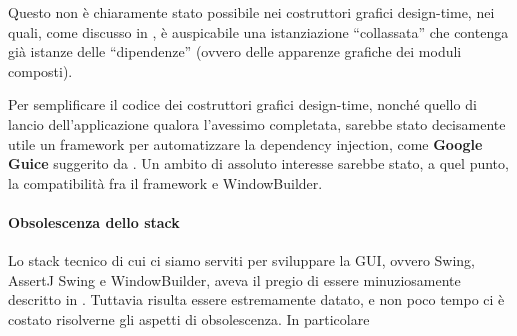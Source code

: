 Questo non è chiaramente stato possibile nei costruttori grafici design-time, nei quali, come discusso in , è auspicabile una istanziazione ``collassata'' che contenga già istanze delle ``dipendenze'' (ovvero delle apparenze grafiche dei moduli composti).

Per semplificare il codice dei costruttori grafici design-time, nonché quello di lancio dell'applicazione qualora l'avessimo completata, sarebbe stato decisamente utile un framework per automatizzare la dependency injection, come \textbf{Google Guice} suggerito da \cite{bettini2019tdd}.
Un ambito di assoluto interesse sarebbe stato, a quel punto, la compatibilità fra il framework e WindowBuilder.

\paragraph{Obsolescenza dello stack}
Lo stack tecnico di cui ci siamo serviti per sviluppare la GUI, ovvero Swing, AssertJ Swing e WindowBuilder, aveva il pregio di essere minuziosamente descritto in \cite{bettini2019tdd}. Tuttavia risulta essere estremamente datato, e non poco tempo ci è costato risolverne gli aspetti di obsolescenza. In particolare

